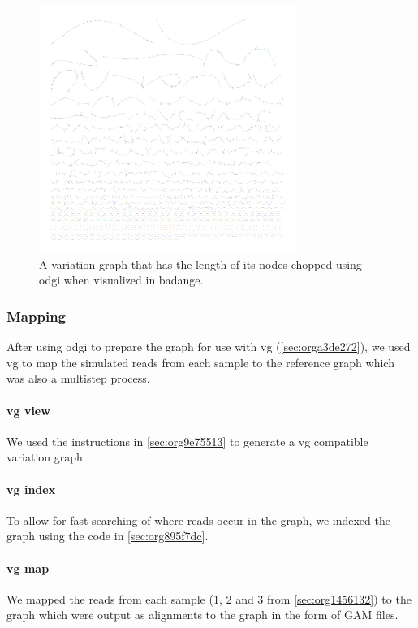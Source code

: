 \documentclass[10pt, a4paper]{article}
\begin{document}
\begin{figure}[h]
\centering
\includegraphics[width=0.75\textwidth]{../Figures/SARS_CoV_2/SARS_Variation_Graph.png}
\caption[SARS-CoV-2 Variation Graph]{\label{fig:org2a9b3d9}
A variation graph that has the length of its nodes chopped using odgi when visualized in badange.}
\end{figure}

\subsubsection{Mapping}
\label{sec:org6c7b164}
After using odgi to prepare the graph for use with vg
(\ref{sec:orga3de272}), we used vg to map the simulated reads from
each sample to the reference graph which was also a multistep process.

\paragraph{vg view}
\label{sec:org736a5e5}
We used the instructions in \ref{sec:org9e75513} to generate a vg
\cite{garrisonVariationGraphToolkit2018} compatible variation graph. 

\paragraph{vg index}
\label{sec:orge953c0f}
To allow for fast searching of where reads occur in the graph, we indexed the 
graph using the code in \ref{sec:org895f7dc}.

\paragraph{vg map}
\label{sec:org8b62418}
We mapped the reads from each sample (1, 2 and 3 from \ref{sec:org1456132}) to the 
graph which were output as alignments to the graph in the form of GAM files. 
\end{document}
